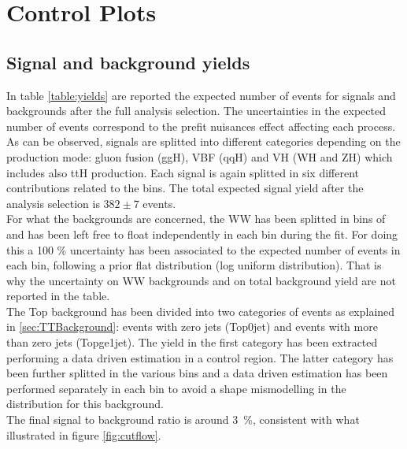 \section{Control Plots}
\label{sec:ControlPlots}

\subsection{Signal and background yields}\label{subsec:yields}
In table \ref{table:yields} are reported the expected number of events for signals and backgrounds after the full analysis selection. The uncertainties in the expected number of events correspond to the prefit nuisances effect affecting each process. As can be observed, signals are splitted into different categories depending on the production mode: gluon fusion (ggH), VBF (qqH) and VH (WH and ZH) which includes also ttH production. Each signal is again splitted in six different contributions related to the \pth bins. The total expected signal yield after the analysis selection is $382 \pm 7$ events.\\
For what the backgrounds are concerned, the WW has been splitted in bins of \pth and has been left free to float independently in each bin during the fit. For doing this a 100 \% uncertainty has been associated to the expected number of events in each bin, following a prior flat distribution (log uniform distribution). That is why the uncertainty on WW backgrounds and on total background yield are not reported in the table.\\
The Top background has been divided into two categories of events as explained in \ref{sec:TTBackground}: events with zero jets (Top0jet) and events with more than zero jets (Topge1jet). The yield in the first category has been extracted performing a data driven estimation in a control region. The latter category has been further splitted in the various \pth bins and a data driven estimation has been performed separately in each bin to avoid a shape mismodelling in the \pth distribution for this background.\\
The final signal to background ratio is around 3~\%, consistent with what illustrated in figure \ref{fig:cutflow}.
